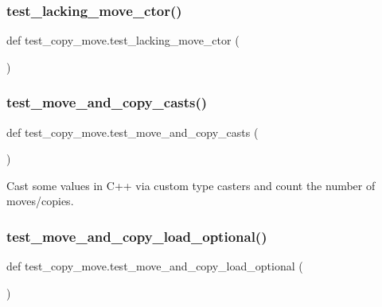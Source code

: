 \mbox{\label{namespacetest__copy__move_a059cbdc4f5c38167eddaffae86153d05}} 
\subsubsection{\texorpdfstring{test\_lacking\_move\_ctor()}{test\_lacking\_move\_ctor()}}
{\footnotesize\ttfamily def test\+\_\+copy\+\_\+move.\+test\+\_\+lacking\+\_\+move\+\_\+ctor (\begin{DoxyParamCaption}{ }\end{DoxyParamCaption})}

\mbox{\label{namespacetest__copy__move_aee1dc18e1802561ebdab609df67cf4c6}} 
\subsubsection{\texorpdfstring{test\_move\_and\_copy\_casts()}{test\_move\_and\_copy\_casts()}}
{\footnotesize\ttfamily def test\+\_\+copy\+\_\+move.\+test\+\_\+move\+\_\+and\+\_\+copy\+\_\+casts (\begin{DoxyParamCaption}{ }\end{DoxyParamCaption})}

\begin{DoxyVerb}Cast some values in C++ via custom type casters and count the number of moves/copies.\end{DoxyVerb}
 \mbox{\label{namespacetest__copy__move_a518bfd196926abd26bf2bf38057fd3b5}} 
\subsubsection{\texorpdfstring{test\_move\_and\_copy\_load\_optional()}{test\_move\_and\_copy\_load\_optional()}}
{\footnotesize\ttfamily def test\+\_\+copy\+\_\+move.\+test\+\_\+move\+\_\+and\+\_\+copy\+\_\+load\+\_\+optional (\begin{DoxyParamCaption}{ }\end{DoxyParamCaption})}

